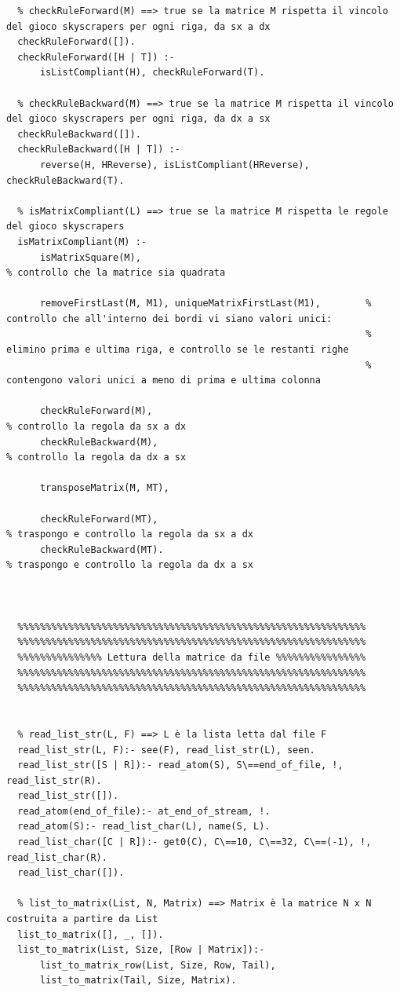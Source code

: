 \documentclass{article}
\begin{document}
\begin{lstlisting}
  % checkRuleForward(M) ==> true se la matrice M rispetta il vincolo del gioco skyscrapers per ogni riga, da sx a dx
  checkRuleForward([]).
  checkRuleForward([H | T]) :-
      isListCompliant(H), checkRuleForward(T).
  
  % checkRuleBackward(M) ==> true se la matrice M rispetta il vincolo del gioco skyscrapers per ogni riga, da dx a sx
  checkRuleBackward([]).
  checkRuleBackward([H | T]) :-
      reverse(H, HReverse), isListCompliant(HReverse), checkRuleBackward(T).
  
  % isMatrixCompliant(L) ==> true se la matrice M rispetta le regole del gioco skyscrapers
  isMatrixCompliant(M) :-
      isMatrixSquare(M), 																				% controllo che la matrice sia quadrata
  
      removeFirstLast(M, M1), uniqueMatrixFirstLast(M1),        % controllo che all'interno dei bordi vi siano valori unici:
                                                                % elimino prima e ultima riga, e controllo se le restanti righe
                                                                % contengono valori unici a meno di prima e ultima colonna
  
      checkRuleForward(M),																			% controllo la regola da sx a dx
      checkRuleBackward(M),																			% controllo la regola da dx a sx
  
      transposeMatrix(M, MT),
  
      checkRuleForward(MT),																			% traspongo e controllo la regola da sx a dx
      checkRuleBackward(MT).																		% traspongo e controllo la regola da dx a sx
  
  

  %%%%%%%%%%%%%%%%%%%%%%%%%%%%%%%%%%%%%%%%%%%%%%%%%%%%%%%%%%%%%%
  %%%%%%%%%%%%%%%%%%%%%%%%%%%%%%%%%%%%%%%%%%%%%%%%%%%%%%%%%%%%%%
  %%%%%%%%%%%%%%% Lettura della matrice da file %%%%%%%%%%%%%%%%
  %%%%%%%%%%%%%%%%%%%%%%%%%%%%%%%%%%%%%%%%%%%%%%%%%%%%%%%%%%%%%%
  %%%%%%%%%%%%%%%%%%%%%%%%%%%%%%%%%%%%%%%%%%%%%%%%%%%%%%%%%%%%%%
  
  
  % read_list_str(L, F) ==> L è la lista letta dal file F
  read_list_str(L, F):- see(F), read_list_str(L), seen.
  read_list_str([S | R]):- read_atom(S), S\==end_of_file, !, read_list_str(R).
  read_list_str([]).
  read_atom(end_of_file):- at_end_of_stream, !.
  read_atom(S):- read_list_char(L), name(S, L).
  read_list_char([C | R]):- get0(C), C\==10, C\==32, C\==(-1), !, read_list_char(R).
  read_list_char([]).

  % list_to_matrix(List, N, Matrix) ==> Matrix è la matrice N x N costruita a partire da List
  list_to_matrix([], _, []).
  list_to_matrix(List, Size, [Row | Matrix]):-
      list_to_matrix_row(List, Size, Row, Tail),
      list_to_matrix(Tail, Size, Matrix).


\end{lstlisting}
\end{document}
